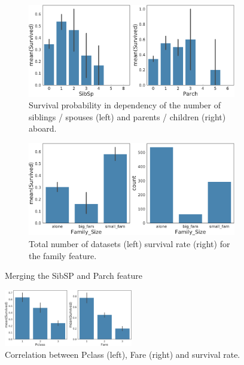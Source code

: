 \begin{figure}
    \centering
    \begin{subfigure}[b]{0.48\textwidth}
     \includegraphics[width=\textwidth]{media_saved/family_size_before}
     \caption{Survival probability in dependency of the number of siblings / spouses (left) and parents / children (right) aboard.}
     \label{fig:familyold}
    \end{subfigure}
    \quad
    \begin{subfigure}[b]{0.48\textwidth}
        \includegraphics[width=\textwidth]{media_saved/family_size_after}
     \caption{Total number of datasets (left) survival rate (right) for the family feature.\\}
     \label{fig:familynew}
    \end{subfigure}
    \caption{Merging the SibSP and Parch feature}
\end{figure}

\begin{figure}
\centering
\includegraphics[width=0.5\textwidth]{media_saved/fare_survived}
     \caption{Correlation between Pclass (left), Fare (right) and survival rate.}
     \label{fig:farefeat}
\end{figure}

